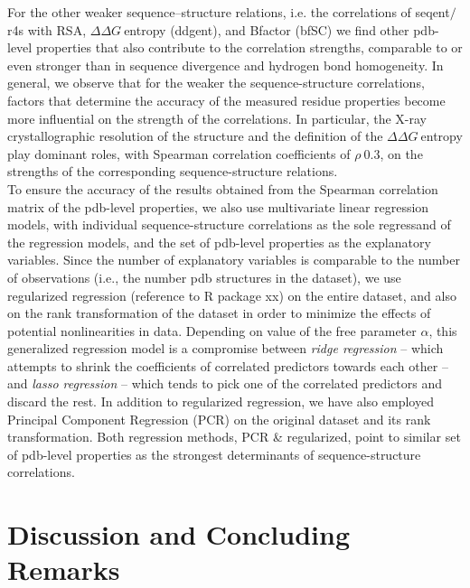 \documentclass[11pt]{article}
\newcommand{\ddg}{$\Delta\Delta G~$}
\begin{document}
        For the other weaker sequence--structure relations, i.e. the correlations of seqent$/$r4s with RSA, \ddg entropy (ddgent), and Bfactor (bfSC) we find other pdb-level properties that also contribute to the correlation strengths, comparable to or even stronger than in sequence divergence and hydrogen bond homogeneity. In general, we observe that for the weaker the sequence-structure correlations, factors that determine the accuracy of the measured residue properties become more influential on the strength of the correlations. In particular, the X-ray crystallographic resolution of the structure and the definition of the \ddg entropy play dominant roles, with Spearman correlation coefficients of $\rho~0.3$, on the strengths of the corresponding sequence-structure relations.
        \\

        To ensure the accuracy of the results obtained from the Spearman correlation matrix of the pdb-level properties, we also use multivariate linear regression models, with individual sequence-structure correlations as the sole regressand of the regression models, and the set of pdb-level properties as the explanatory variables.  Since the number of explanatory variables is comparable to the number of observations (i.e., the number pdb structures in the dataset), we use regularized regression (reference to R package xx) on the entire dataset, and also on the rank transformation of the dataset in order to minimize the effects of potential nonlinearities in data. Depending on value of the free parameter $\alpha$, this generalized regression model is a compromise between {\it ridge regression} -- which attempts to shrink the coefficients of correlated predictors towards each other -- and {\it lasso regression} -- which tends to pick one of the correlated predictors and discard the rest. In addition to regularized regression, we have also employed Principal Component Regression (PCR) on the original dataset and its rank transformation. Both regression methods, PCR \& regularized, point to similar set of pdb-level properties as the strongest determinants of sequence-structure correlations.



\section{Discussion and Concluding Remarks}
\label{sec:dcr}
\end{document}
